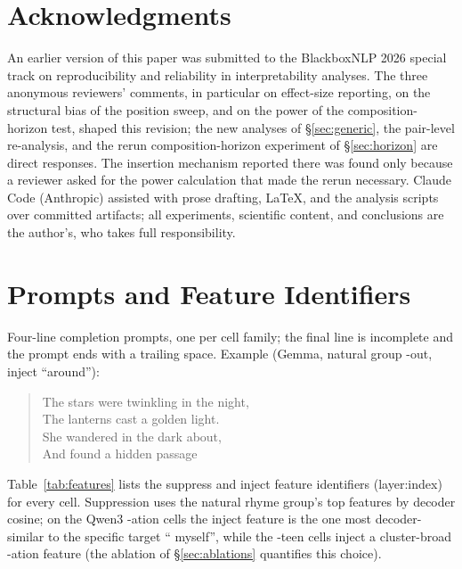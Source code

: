 \documentclass[11pt]{article}
\begin{document}
\section*{Acknowledgments}
An earlier version of this paper was submitted to the BlackboxNLP 2026 special track on reproducibility and reliability in interpretability analyses. The three anonymous reviewers' comments, in particular on effect-size reporting, on the structural bias of the position sweep, and on the power of the composition-horizon test, shaped this revision; the new analyses of \S\ref{sec:generic}, the pair-level re-analysis, and the rerun composition-horizon experiment of \S\ref{sec:horizon} are direct responses. The insertion mechanism reported there was found only because a reviewer asked for the power calculation that made the rerun necessary. Claude Code (Anthropic) assisted with prose drafting, LaTeX, and the analysis scripts over committed artifacts; all experiments, scientific content, and conclusions are the author's, who takes full responsibility.



\appendix

\section{Prompts and Feature Identifiers}
\label{app:prompts}

Four-line completion prompts, one per cell family; the final line is incomplete and the prompt ends with a trailing space. Example (Gemma, natural group -out, inject ``around''):

\begin{quote}\small\ttfamily
The stars were twinkling in the night,\\
The lanterns cast a golden light.\\
She wandered in the dark about,\\
And found a hidden passage \textvisiblespace
\end{quote}

Table~\ref{tab:features} lists the suppress and inject feature identifiers (layer:index) for every cell. Suppression uses the natural rhyme group's top features by decoder cosine; on the Qwen3 -ation cells the inject feature is the one most decoder-similar to the specific target `` myself'', while the -teen cells inject a cluster-broad -ation feature (the ablation of \S\ref{sec:ablations} quantifies this choice).
\end{document}

